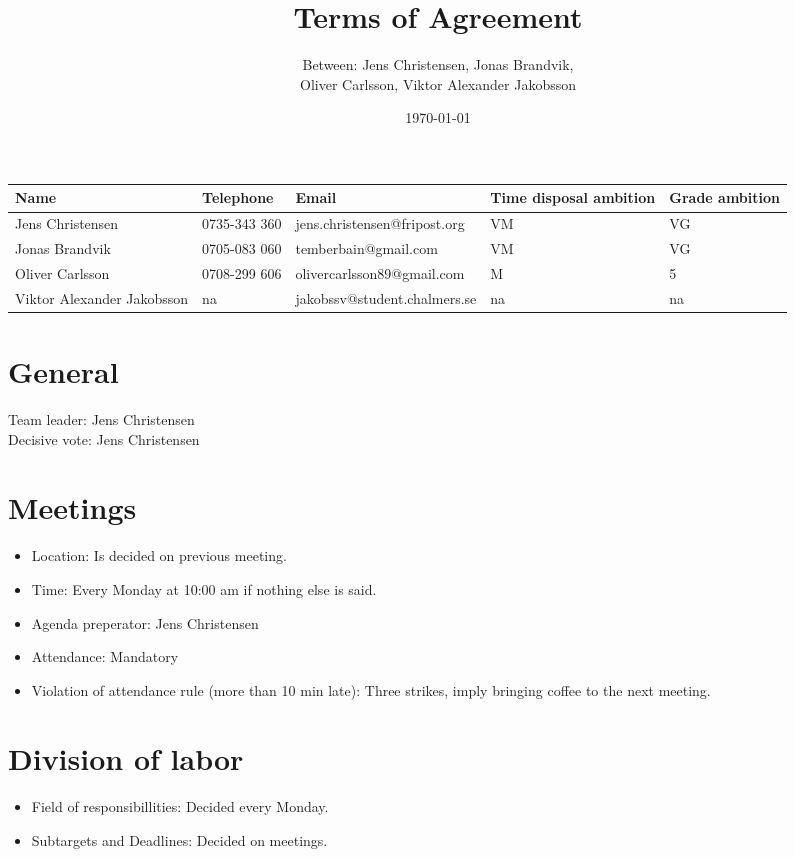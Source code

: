 \documentclass[11pt]{article}
\title{Terms of Agreement}
\date{\today}
\author{Between: Jens Christensen, Jonas Brandvik, \\ 
	Oliver Carlsson, Viktor Alexander Jakobsson}
\begin{document}
\maketitle

\begin{center}
	\begin{tabular}{ | p{3cm} | p{2.5cm} | p{5cm} | p{2cm} | p{2cm} | }
	\hline
	Name & Telephone & Email & Time disposal ambition & Grade ambition \\ \hline
	Jens Christensen & 0735-343 360 & jens.christensen@fripost.org & VM & VG \\ \hline
	Jonas Brandvik & 0705-083 060 & temberbain@gmail.com & VM & VG \\ \hline
	Oliver Carlsson & 0708-299 606 & olivercarlsson89@gmail.com & M & 5 \\ \hline
	Viktor Alexander Jakobsson & na & jakobssv@student.chalmers.se & na & na \\ \hline
	\end{tabular}
\end{center}


\section*{General}
Team leader: Jens Christensen \\
Decisive vote: Jens Christensen \\

\section*{Meetings}
\begin{itemize}

	\item Location: Is decided on previous meeting.
	\item Time: Every Monday at 10:00 am if nothing else is said.
	\item Agenda preperator: Jens Christensen
	\item Attendance: Mandatory
	\item Violation of attendance rule (more than 10 min late): Three strikes, imply bringing coffee to the next meeting.
\end{itemize}


\section*{Division of labor}
\begin{itemize}
	\item Field of responsibillities: Decided every Monday.
	\item Subtargets and Deadlines: Decided on meetings.

\end{itemize}
\end{document}
